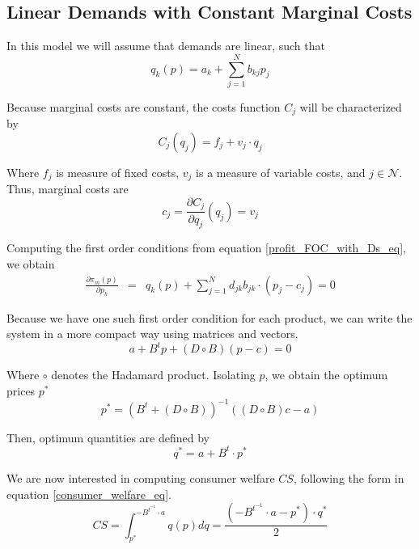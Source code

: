 \documentclass[12pt]{article}
\begin{document}
\subsection{Linear Demands with Constant Marginal Costs}

In this model we will assume that demands are linear, such that
\begin{equation*}
q_k(p) = a_k + \sum_{j=1}^N b_{kj}p_j
\end{equation*}

Because marginal costs are constant, the costs function $C_j$ will be characterized by
\begin{equation*}
C_j (q_j)= f_j + v_j \cdot q_j
\end{equation*}

Where $f_j$ is measure of fixed costs, $v_j$ is a measure of variable costs, and  $j \in \mathcal{N}$. Thus, marginal costs are
\begin{equation*}
c_j = \frac{\partial C_j}{\partial q_j}(q_j) = v_j
\end{equation*}

Computing the first order conditions from equation \ref{profit_FOC_with_Ds_eq}, we obtain
\begin{eqnarray*}
\frac{\partial\pi_m(p)}{\partial p_k}
&=& q_k(p) + \sum_{j = 1}^N d_{jk}b_{jk} \cdot (p_j - c_j) = 0
\end{eqnarray*}

Because we have one such first order condition for each product, we can write the system in a more compact way using matrices and vectors.
\begin{equation*}
a + B^t p + (D \circ B)(p - c) = 0
\end{equation*}

Where $\circ$ denotes the Hadamard product.
Isolating $p$, we obtain the optimum prices $p^*$
\begin{equation*}
p^* = (B^t + (D \circ B))^{-1}((D \circ B) c - a)
\end{equation*}

Then, optimum quantities are defined by
\begin{equation*}
q^* = a + B^t \cdot p^*
\end{equation*}

We are now interested in computing consumer welfare $CS$, following the form in equation \ref{consumer_welfare_eq}. 
\begin{equation*}
CS = \int_{p^*}^{-B^{t^{-1}} \cdot a} q(p) dq = \frac{(-B^{t^{-1}} \cdot a - p^*) \cdot q^*}{2} 
\end{equation*}
\end{document}
